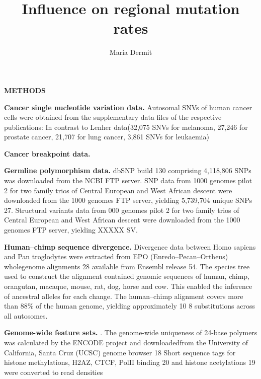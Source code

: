 \documentclass[11pt, oneside]{article}     %
\title{Influence on regional mutation rates}
\author{Maria Dermit}
\begin{document}
\maketitle
{\bf{\color{blue} METHODS}}

\textbf{Cancer single nucleotide variation data.} 
 Autosomal SNVs of human cancer cells
were obtained from the supplementary data files of the respective publications:
In contrast to Lenher data(32,075 SNVs for melanoma, 27,246 for prostate cancer, 21,707 for lung cancer, 3,861 SNVs for leukaemia) 
 
 \textbf{Cancer breakpoint data.}



 \textbf{Germline polymorphism data.} 
 dbSNP build 130 comprising 4,118,806 SNPs was
downloaded from the NCBI FTP server. SNP data from 1000 genomes pilot 2 for
two family trios of Central European and West African descent were downloaded
from the 1000 genomes FTP server, yielding 5,739,704 unique SNPs
27. Structural variants data from 000 genomes pilot 2 for two family trios of Central European and West African descent were downloaded
from the 1000 genomes FTP server, yielding XXXXX SV.

\textbf{Human–chimp sequence divergence.}
Divergence data between Homo sapiens
and Pan troglodytes were extracted from EPO (Enredo–Pecan–Ortheus) wholegenome alignments
28 available from Ensembl release 54. The species tree used to
construct the alignment contained genomic sequences of human, chimp,
orangutan, macaque, mouse, rat, dog, horse and cow. This enabled the inference
of ancestral alleles for each change. The human–chimp alignment covers more
than 88\% of the human genome, yielding approximately 10 8
substitutions across
all autosomes.

\textbf{Genome-wide feature sets.}
. The genome-wide uniqueness of
24-base polymers was calculated by the ENCODE project and downloadedfrom the
University of California, Santa Cruz (UCSC) genome browser
18 Short sequence tags for histone methylations, H2AZ,
CTCF, PolII binding 20
and histone acetylations 19
were converted to read densities

 
\end{document}
